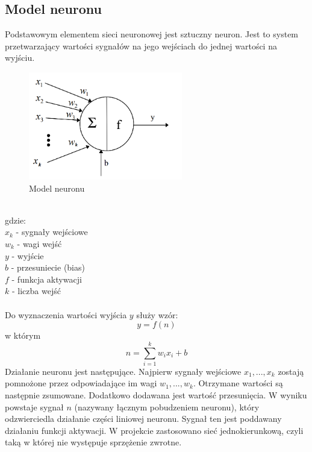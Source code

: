 \documentclass[a4paper, openright, twoside,11pt]{article}
\begin{document}
    \subsection{Model neuronu}
   Podstawowym elementem sieci neuronowej jest sztuczny neuron. Jest to system przetwarzający wartości sygnałów na jego wejściach do jednej wartości na wyjściu. 
    \begin{figure}[h]
        \centering
        \includegraphics[width=0.6\textwidth]{Grafika/neuron.png}
        \caption{Model neuronu}
        \label{fig:neuron}
    \end{figure}\\
    gdzie:\\[0.1cm]
    $x_k$ - sygnały wejściowe\\
    $w_k$ - wagi wejść\\
    $y$ - wyjście\\
    $b$ - przesuniecie (bias)\\
    $f$ - funkcja aktywacji\\
    $k$ - liczba wejść\\
    \\[0.5cm]
    Do wyznaczenia wartości wyjścia $y$ służy wzór:
    \begin{equation}\label{fun_aktywacji}
    y = f(n)
    \end{equation}
    w którym
    \begin{equation} \label{pobudzenieNeuronu}
    n = \sum_{i=1}^k w_i x_i + b
    \end{equation}
    Działanie neuronu jest następujące. Najpierw sygnały wejściowe $x_1, ...,x_k$ zostają pomnożone przez odpowiadające im wagi $w_1, ...,w_k$. Otrzymane wartości są następnie zsumowane. Dodatkowo dodawana jest wartość przesunięcia. W wyniku powstaje sygnał $n$ (nazywany łącznym pobudzeniem neuronu), który odzwierciedla działanie części liniowej neuronu. Sygnał ten jest poddawany działaniu funkcji aktywacji. W projekcie zastosowano sieć jednokierunkową, czyli taką w której nie występuje sprzężenie zwrotne.
\end{document}
